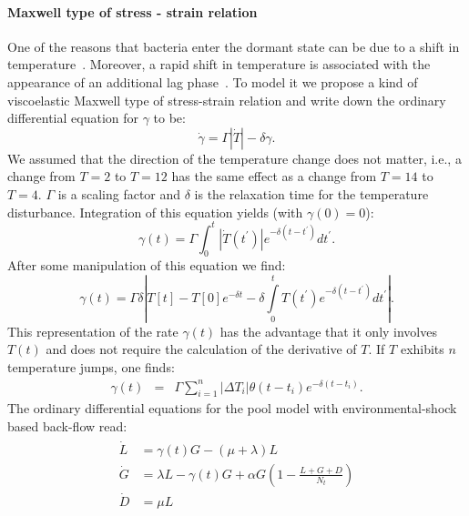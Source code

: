 \documentclass[10pt,twocolumn,5p]{elsarticle}
\numberwithin{equation}{section}
\begin{document}
\paragraph{Maxwell type of stress - strain relation}
One of the reasons that bacteria enter the dormant state can be due to a shift in temperature~\cite{oliver_viable_1995}.
Moreover, a rapid shift in temperature is associated with the appearance of an additional lag phase~\cite{zwietering_modeling_1994}.
To model it we propose a kind of viscoelastic Maxwell type of stress-strain relation and write down the ordinary differential equation for $\gamma$ to be:
\begin{equation}
    \dot{\gamma} = \Gamma |\dot{T}|-\delta \gamma.
\end{equation}
We assumed that the direction of the temperature change does not matter, i.e., a change from $T=2$ to $T=12$ has the same effect as a change from $T=14$ to $T=4$.
$\Gamma$ is a scaling factor and $\delta$ is the relaxation time for the temperature disturbance.
Integration of this equation yields (with $\gamma(0)=0$):
\begin{equation}
    \gamma(t) = \Gamma \int_0^t |\dot{T}(t^{\prime})|e^{-\delta (t-t^{\prime})}dt^{\prime}.
\end{equation}
After some manipulation of this equation we find:
\begin{equation}
    \gamma(t) = \Gamma\delta\left |T[t]-T[0]e^{-\delta t}-\delta
        \int\limits_0^t T(t^{\prime})e^{-\delta (t-t^{\prime})}dt^{\prime}\right |.
\end{equation}
This representation of the rate $\gamma(t)$ has the advantage that it only involves $T(t)$ and does not require the calculation of the derivative of $T$.
If $T$ exhibits $n$ temperature jumps, one finds:
\begin{eqnarray}
    \gamma(t) &=& \Gamma\sum_{i=1}^n \left |\Delta T_i \right |\theta(t-t_i)e^{-\delta(t-t_i)}.
\label{eq:gamma_tempshift}
\end{eqnarray}
%
The ordinary differential equations for the pool model with environmental-shock based back-flow read:
\begin{align}
    \begin{split}
        \dot{L} &=\gamma(t) G - (\mu + \lambda) L\\
        \dot{G} &= \lambda L -\gamma(t) G + \alpha G\left(1-\frac{L+G+D}{N_t}\right)\\
        \dot{D} &= \mu  L 
\end{split}
\label{eq:ode_tempshift_backlag}
\end{align}
\end{document}
